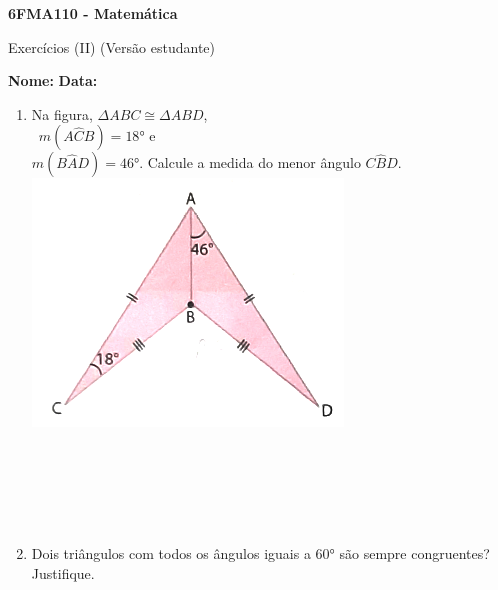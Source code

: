 \documentclass[a4paper,14pt]{article}
\begin{document}
	
	\noindent\textbf{6FMA110 - Matemática} 
	
	\begin{center}Exercícios (II) (Versão estudante)
	\end{center}
	
	\noindent\textbf{Nome:} \underline{\hspace{10cm}}
	\noindent\textbf{Data:} \underline{\hspace{4cm}}
	
	
	\begin{multicols}{2}
		\begin{enumerate} 
			\item Na figura, $\Delta$$ABC \cong \Delta$$ABD$, \\~$m(A\hat{C}B) = 18$° e \\ $m(B\hat{A}D) = 46$°. Calcule a medida do menor ângulo $C\hat{B}D$.
			\includegraphics[width=1\linewidth]{6FMA110_imagens/imagem1}
			\\\\\\\\\\\\
			\item Dois triângulos com todos os ângulos iguais a 60° são sempre congruentes? Justifique. \\\\\\\\\\\\\\\\\\\\\\\\

\end{enumerate}
\end{multicols}
\end{document}
